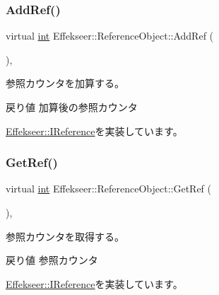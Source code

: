 \subsubsection{\texorpdfstring{Add\+Ref()}{AddRef()}}
{\footnotesize\ttfamily virtual \mbox{\hyperlink{namespace_effekseer_ace0abf7c2e6947e519ebe8b54cbcc30a}{int}} Effekseer\+::\+Reference\+Object\+::\+Add\+Ref (\begin{DoxyParamCaption}{ }\end{DoxyParamCaption})\hspace{0.3cm}{\ttfamily [inline]}, {\ttfamily [virtual]}}



参照カウンタを加算する。 

\begin{DoxyReturn}{戻り値}
加算後の参照カウンタ 
\end{DoxyReturn}


\mbox{\hyperlink{class_effekseer_1_1_i_reference_a3e3b54e8e5081e24f5784e4f9b8f6257}{Effekseer\+::\+I\+Reference}}を実装しています。

\mbox{\label{class_effekseer_1_1_reference_object_a4b8c3d79c58ca527850733691053cf5a}} 
\subsubsection{\texorpdfstring{Get\+Ref()}{GetRef()}}
{\footnotesize\ttfamily virtual \mbox{\hyperlink{namespace_effekseer_ace0abf7c2e6947e519ebe8b54cbcc30a}{int}} Effekseer\+::\+Reference\+Object\+::\+Get\+Ref (\begin{DoxyParamCaption}{ }\end{DoxyParamCaption})\hspace{0.3cm}{\ttfamily [inline]}, {\ttfamily [virtual]}}



参照カウンタを取得する。 

\begin{DoxyReturn}{戻り値}
参照カウンタ 
\end{DoxyReturn}


\mbox{\hyperlink{class_effekseer_1_1_i_reference_a95274c788c8c03d27a3e424facc728b6}{Effekseer\+::\+I\+Reference}}を実装しています。

\mbox{\label{class_effekseer_1_1_reference_object_a6b0e9aa4d994b557d499b15359b580d8}} 
